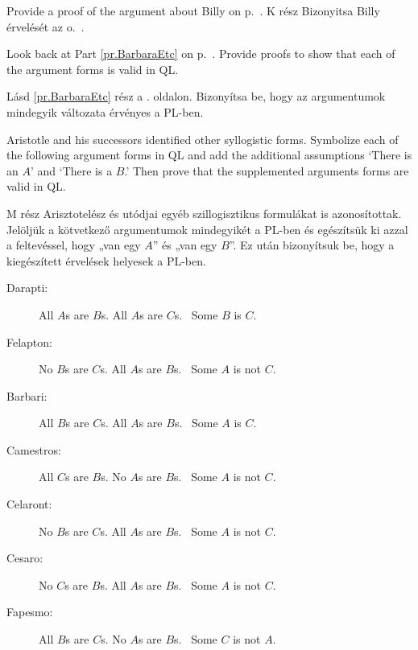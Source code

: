 \problempart
Provide a proof of the argument about Billy on p.~\pageref{surgeon2}.
K rész Bizonyitsa Billy érvelését az o.~\pageref{surgeon2}.




\problempart
\label{pr.BarbaraEtc.proof1}
Look back at Part \ref{pr.BarbaraEtc} on p.~\pageref{pr.BarbaraEtc}. Provide proofs to show that each of the argument forms is valid in QL.

Lásd \ref{pr.BarbaraEtc} rész a \pageref{pr.BarbaraEtc}. oldalon. Bizonyítsa be, hogy az argumentumok mindegyik változata érvényes a PL-ben.


\problempart
\label{pr.BarbaraEtc.proof2}
Aristotle and his successors identified other syllogistic forms. Symbolize each of the following argument forms in QL and add the additional assumptions `There is an $A$' and `There is a $B$.' Then prove that the supplemented arguments forms are valid in QL.

M rész Arisztotelész és utódjai egyéb szillogisztikus formulákat is azonosítottak. Jelöljük a kötvetkező argumentumok mindegyikét a PL-ben és egészítsük ki azzal a feltevéssel, hogy „van egy $A$” és „van egy $B$”. Ez után bizonyítsuk be, hogy a kiegészített érvelések helyesek a PL-ben.


\begin{description}
\item[Darapti:] All $A$s are $B$s. All $A$s are $C$s.
	\therefore\  Some $B$ is $C$.
\item[Felapton:] No $B$s are $C$s. All $A$s are $B$s.
	\therefore\  Some $A$ is not $C$.
\item[Barbari:] All $B$s are $C$s. All $A$s are $B$s.
	\therefore\  Some $A$ is $C$.
\item[Camestros:] All $C$s are $B$s. No $A$s are $B$s.
	\therefore\  Some $A$ is not $C$.
\item[Celaront:] No $B$s are $C$s. All $A$s are $B$s.
	\therefore\  Some $A$ is not $C$.
\item[Cesaro:] No $C$s are $B$s. All $A$s are $B$s.
	\therefore\  Some $A$ is not $C$.
\item[Fapesmo:] All $B$s are $C$s. No $A$s are $B$s.
	\therefore\  Some $C$ is not $A$.
\end{description}


